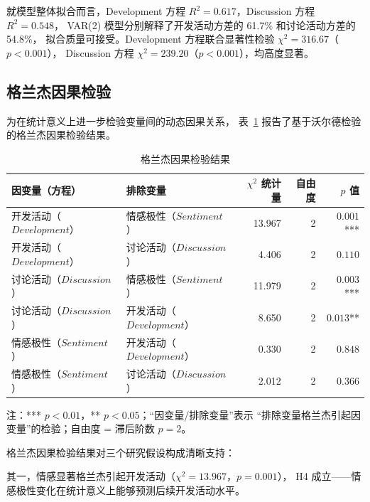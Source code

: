 就模型整体拟合而言，Development 方程 $R^2 = 0.617$，Discussion 方程 $R^2 = 0.548$，
VAR(2) 模型分别解释了开发活动方差的 61.7\% 和讨论活动方差的 54.8\%，
拟合质量可接受。Development 方程联合显著性检验 $\chi^2 = 316.67$（$p < 0.001$），
Discussion 方程 $\chi^2 = 239.20$（$p < 0.001$），均高度显著。

\subsection{格兰杰因果检验}

为在统计意义上进一步检验变量间的动态因果关系，
表~\ref{tab:granger} 报告了基于沃尔德检验的格兰杰因果检验结果。

\begin{table}[htbp]
    \centering
    \caption{格兰杰因果检验结果}
    \label{tab:granger}
    \begin{tabularx}{\textwidth}{p{3.5cm}Xrrr}
        \toprule
        因变量（方程） & 排除变量 & $\chi^2$ 统计量 & 自由度 & $p$ 值 \\
        \midrule
        开发活动（$Development$）     & 情感极性（$Sentiment$） & 13.967 & 2 & $0.001$*** \\
        开发活动（$Development$）     & 讨论活动（$Discussion$）   & 4.406  & 2 & $0.110$ \\
        讨论活动（$Discussion$）  & 情感极性（$Sentiment$） & 11.979 & 2 & $0.003$*** \\
        讨论活动（$Discussion$）  & 开发活动（$Development$）      & 8.650  & 2 & $0.013$** \\
        情感极性（$Sentiment$） & 开发活动（$Development$）      & 0.330  & 2 & $0.848$ \\
        情感极性（$Sentiment$） & 讨论活动（$Discussion$）   & 2.012  & 2 & $0.366$ \\
        \bottomrule
    \end{tabularx}
    \begin{minipage}{\textwidth}
        \vspace{0.3em}
        \footnotesize 注：*** $p < 0.01$，** $p < 0.05$；“因变量/排除变量”表示
              “排除变量格兰杰引起因变量”的检验；自由度 = 滞后阶数 $p = 2$。
    \end{minipage}
\end{table}

格兰杰因果检验结果对三个研究假设构成清晰支持：

其一，情感显著格兰杰引起开发活动（$\chi^2 = 13.967$，$p = 0.001$），
H4 成立——情感极性变化在统计意义上能够预测后续开发活动水平。

